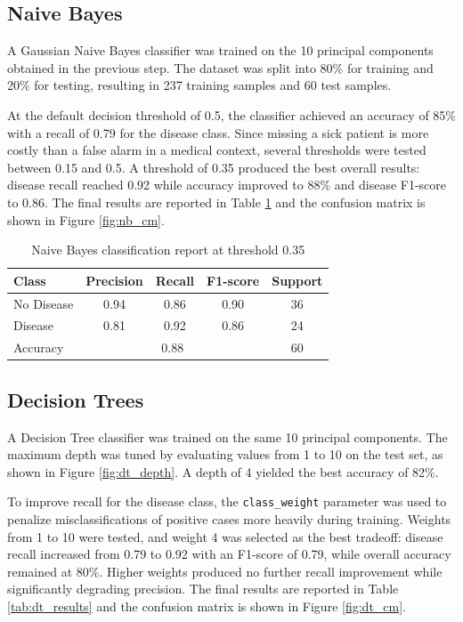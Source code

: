\documentclass{article}
\begin{document}
\subsection*{Naive Bayes}

A Gaussian Naive Bayes classifier was trained on the 10 principal components obtained in the previous step. The dataset was split into 80\% for training and 20\% for testing, resulting in 237 training samples and 60 test samples.

At the default decision threshold of 0.5, the classifier achieved an accuracy of 85\% with a recall of 0.79 for the disease class. Since missing a sick patient is more costly than a false alarm in a medical context, several thresholds were tested between 0.15 and 0.5. A threshold of 0.35 produced the best overall results: disease recall reached 0.92 while accuracy improved to 88\% and disease F1-score to 0.86. The final results are reported in Table \ref{tab:nb_results} and the confusion matrix is shown in Figure \ref{fig:nb_cm}.

\begin{table}[h]
\centering
\begin{tabular}{lcccc}
\toprule
Class & Precision & Recall & F1-score & Support \\
\midrule
No Disease & 0.94 & 0.86 & 0.90 & 36 \\
Disease    & 0.81 & 0.92 & 0.86 & 24 \\
\midrule
Accuracy   & \multicolumn{3}{c}{0.88} & 60 \\
\bottomrule
\end{tabular}
\caption{Naive Bayes classification report at threshold 0.35}
\label{tab:nb_results}
\end{table}

\subsection*{Decision Trees}

A Decision Tree classifier was trained on the same 10 principal components. The maximum depth was tuned by evaluating values from 1 to 10 on the test set, as shown in Figure \ref{fig:dt_depth}. A depth of 4 yielded the best accuracy of 82\%.

To improve recall for the disease class, the \texttt{class\_weight} parameter was used to penalize misclassifications of positive cases more heavily during training. Weights from 1 to 10 were tested, and weight 4 was selected as the best tradeoff: disease recall increased from 0.79 to 0.92 with an F1-score of 0.79, while overall accuracy remained at 80\%. Higher weights produced no further recall improvement while significantly degrading precision. The final results are reported in Table \ref{tab:dt_results} and the confusion matrix is shown in Figure \ref{fig:dt_cm}.
\end{document}
